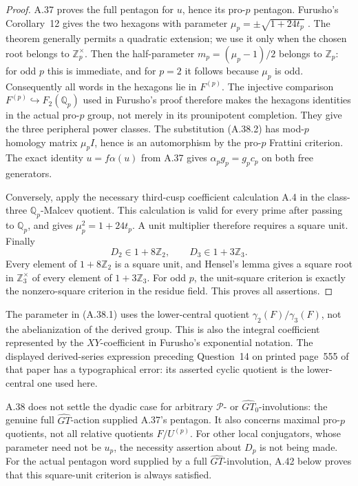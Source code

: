 \begin{proof}
A.37 proves the full pentagon for \(u\), hence its
pro-\(p\) pentagon. Furusho's Corollary~12 gives the
two hexagons with parameter
\(\mu_p=\pm\sqrt{1+24t_p}\)
\cite[Theorem 2 and \S3, Corollary 12]{Furusho2010}.
The theorem generally permits a quadratic extension;
we use it only when the chosen root belongs to
\(\mathbb Z_p^{\times}\). Then the half-parameter
\(m_p=(\mu_p-1)/2\) belongs to \(\mathbb Z_p\):
for odd \(p\) this is immediate, and for \(p=2\)
it follows because \(\mu_p\) is odd. Consequently
all words in the hexagons lie in \(F^{(p)}\).
The injective comparison
\(F^{(p)}\hookrightarrow F_2(\mathbb Q_p)\)
used in Furusho's proof therefore makes the
hexagons identities in the actual pro-\(p\) group,
not merely in its prounipotent completion.
They give the three peripheral power classes.
The substitution (A.38.2) has mod-\(p\) homology
matrix \(\mu_p I\), hence is an automorphism by the
pro-\(p\) Frattini criterion. The exact identity
\(u=f\alpha(u)\) from A.37 gives
\(\alpha_p g_p=g_p c_p\) on both free generators.

Conversely, apply the necessary third-cusp coefficient
calculation A.4 in the class-three
\(\mathbb Q_p\)-Malcev quotient. This calculation is
valid for every prime after passing to \(\mathbb Q_p\),
and gives
\(\mu_p^2=1+24t_p\). A unit multiplier therefore
requires a square unit. Finally
\[
       D_2\in1+8\mathbb Z_2,
       \qquad D_3\in1+3\mathbb Z_3.
\]
Every element of \(1+8\mathbb Z_2\) is a square
unit, and Hensel's lemma gives a square root in
\(\mathbb Z_3^{\times}\) of every element of
\(1+3\mathbb Z_3\). For odd \(p\), the unit-square
criterion is exactly the nonzero-square criterion
in the residue field. This proves all assertions.
\end{proof}

The parameter in (A.38.1) uses the lower-central
quotient \(\gamma_2(F)/\gamma_3(F)\), not the
abelianization of the derived group. This is also
the integral coefficient represented by the
\(XY\)-coefficient in Furusho's exponential
notation. The displayed derived-series expression
preceding Question~14 on printed page~555 of that
paper has a typographical error: its asserted
cyclic quotient is the lower-central one used here.

A.38 does not settle the dyadic case for arbitrary
\(\mathcal P\)- or \(\widehat{GT}_0\)-involutions:
the genuine full \(\widehat{GT}\)-action supplied
A.37's pentagon. It also concerns maximal pro-\(p\)
quotients, not all relative quotients \(F/U^{(p)}\).
For other local conjugators, whose parameter need
not be \(u_p\), the necessity assertion about
\(D_p\) is not being made.
For the actual pentagon word supplied by a full
\(\widehat{GT}\)-involution, A.42 below proves
that this square-unit criterion is always satisfied.

